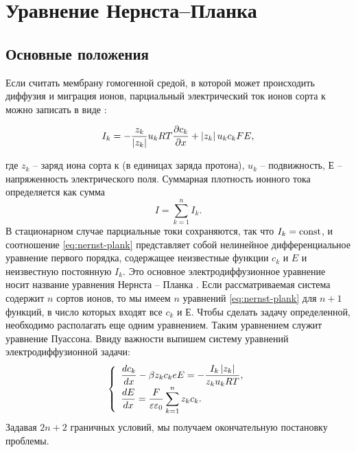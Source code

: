 \chapter{Уравнение Нернста--Планка}
\section{Основные положения}

Если считать мембрану гомогенной средой, в которой может происходить диффузия и
миграция ионов, парциальный электрический ток ионов сорта к можно записать в
виде \cite{bib:08}:

\begin{equation}
    I_k = -\frac{z_k}{\left| z_k \right|}u_kRT\frac{\partial c_k}{\partial x} + \left| z_k \right|u_kc_kFE,
    \label{eq:nernst-plank}
\end{equation}

где \( z_k \) -- заряд иона сорта к (в единицах заряда протона), \( u_k \) --
подвижность, Е -- напряженность электрического поля.
Суммарная плотность ионного тока определяется как сумма
\[
    I = \sum_{k=1}^n I_k.
\]
В стационарном случае парциальные токи сохраняются, так что \( I_k = \mathrm{const} \),
и соотношение \eqref{eq:nernst-plank} представляет собой нелинейное
дифференциальное уравнение первого порядка, содержащее неизвестные функции
\( c_k \) и \( E \) и неизвестную постоянную \( I_k \). Это основное
электродиффузионное уравнение носит название уравнения Нернста -- Планка
\cite{bib:16}.
Если рассматриваемая система содержит \( n \) сортов ионов, то мы имеем \( n \)
уравнений \eqref{eq:nernst-plank} для \( n + 1 \) функций, в число которых
входят все \( c_k \) и \( Е \). Чтобы сделать задачу определенной, необходимо
располагать еще одним уравнением. Таким уравнением служит уравнение Пуассона.
Ввиду важности выпишем систему уравнений электродиффузионной задачи:
\begin{equation}
\left\{
    \begin{array}{l}
        \displaystyle \frac{d c_k}{d x} - \beta z_k c_k e E =
            - \frac{I_k\left| z_k \right|}{z_k u_k RT},\\
        \displaystyle \frac{d E}{d x} = \frac{F}{\varepsilon\varepsilon_0}\sum_{k=1}^n z_k c_k.
    \end{array}
\right.
\label{eq:system_nernst-plank}
\end{equation}
Задавая \( 2n + 2 \) граничных условий, мы получаем окончательную постановку
проблемы.

